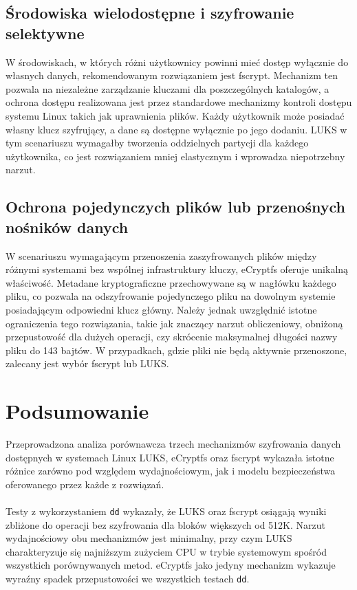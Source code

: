 \documentclass[a4paper]{article}
\begin{document}
\subsection{Środowiska wielodostępne i szyfrowanie selektywne}

W środowiskach, w których różni użytkownicy powinni mieć dostęp wyłącznie do własnych
danych, rekomendowanym rozwiązaniem jest fscrypt. Mechanizm ten pozwala na niezależne
zarządzanie kluczami dla poszczególnych katalogów, a ochrona dostępu realizowana jest przez
standardowe mechanizmy kontroli dostępu systemu Linux takich jak uprawnienia plików. Każdy
użytkownik może posiadać własny klucz szyfrujący, a dane są dostępne wyłącznie po jego dodaniu.
LUKS w tym scenariuszu wymagałby tworzenia oddzielnych partycji dla każdego użytkownika,
co jest rozwiązaniem mniej elastycznym i wprowadza niepotrzebny narzut.

\subsection{Ochrona pojedynczych plików lub przenośnych nośników danych}

W scenariuszu wymagającym przenoszenia zaszyfrowanych plików między różnymi systemami
bez wspólnej infrastruktury kluczy, eCryptfs oferuje unikalną właściwość. Metadane
kryptograficzne przechowywane są w nagłówku każdego pliku, co pozwala na odszyfrowanie
pojedynczego pliku na dowolnym systemie posiadającym odpowiedni klucz główny. Należy jednak
uwzględnić istotne ograniczenia tego rozwiązania, takie jak znaczący narzut obliczeniowy,
obniżoną przepustowość dla dużych operacji, czy skrócenie maksymalnej długości nazwy pliku do
143 bajtów. W przypadkach, gdzie pliki nie będą aktywnie przenoszone, zalecany jest wybór fscrypt
lub LUKS.


\section{Podsumowanie}

Przeprowadzona analiza porównawcza trzech mechanizmów szyfrowania danych dostępnych
w systemach Linux LUKS, eCryptfs oraz fscrypt wykazała istotne różnice zarówno pod względem
wydajnościowym, jak i modelu bezpieczeństwa oferowanego przez każde z rozwiązań.
\\\\
Testy z wykorzystaniem \texttt{dd} wykazały, że LUKS oraz fscrypt osiągają wyniki zbliżone
do operacji bez szyfrowania dla bloków większych od 512K. Narzut wydajnościowy
obu mechanizmów jest minimalny, przy czym LUKS charakteryzuje się najniższym zużyciem CPU
w trybie systemowym spośród wszystkich porównywanych metod. eCryptfs jako jedyny mechanizm
wykazuje wyraźny spadek przepustowości we wszystkich testach \texttt{dd}.
\end{document}
